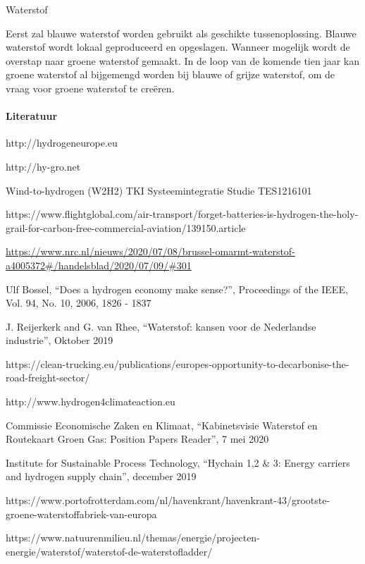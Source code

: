\begin{voorstel}{Waterstof}
\begin{multicols*}{2}
\begin{aanbevelingen}
 Eerst zal blauwe waterstof worden gebruikt als geschikte tussenoplossing. Blauwe waterstof wordt lokaal geproduceerd en opgeslagen. Wanneer mogelijk wordt de overstap naar groene waterstof gemaakt. In de loop van de komende tien jaar kan groene waterstof al bijgemengd worden bij blauwe of grijze waterstof, om de vraag voor groene waterstof te creëren.


\end{aanbevelingen}

\paragraph{Literatuur}
http://hydrogeneurope.eu

http://hy-gro.net

Wind-to-hydrogen (W2H2) TKI Systeemintegratie Studie TES1216101

https://www.flightglobal.com/air-transport/forget-batteries-is-hydrogen-the-holy-grail-for-carbon-free-commercial-aviation/139150.article

\url{https://www.nrc.nl/nieuws/2020/07/08/brussel-omarmt-waterstof-a4005372#/handelsblad/2020/07/09/#301}

Ulf Bossel, “Does a hydrogen economy make sense?”, Proceedings of the IEEE, Vol. 94, No. 10, 2006, 1826 - 1837

J. Reijerkerk and G. van Rhee, “Waterstof: kansen voor de Nederlandse industrie”, Oktober 2019

https://clean-trucking.eu/publications/europes-opportunity-to-decarbonise-the-road-freight-sector/

http://www.hydrogen4climateaction.eu

Commissie Economische Zaken en Klimaat, “Kabinetsvisie Waterstof en Routekaart Groen Gas: Position Papers Reader”, 7 mei 2020

Institute for Sustainable Process Technology, “Hychain 1,2 \& 3: Energy carriers and hydrogen supply chain”, december 2019

https://www.portofrotterdam.com/nl/havenkrant/havenkrant-43/grootste-groene-waterstoffabriek-van-europa

https://www.natuurenmilieu.nl/themas/energie/projecten-energie/waterstof/waterstof-de-waterstofladder/

\end{multicols*}

\end{voorstel}
